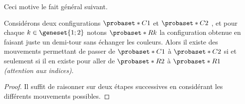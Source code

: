 Ceci motive le fait général suivant.


\begin{fact} \label{symmetry-no-color}
	Considérons deux configurations $\probaset*{C}{1}$ et $\probaset*{C}{2}$ , et pour chaque $k \in \geneset{1 ; 2}$ notons $\probaset*{R}{k}$ la configuration obtenue en faisant juste un demi-tour sans échanger les couleurs.
	Alors il existe des mouvements permettant de passer de $\probaset*{C}{1}$ à $\probaset*{C}{2}$ si et seulement si il en existe pour aller de $\probaset*{R}{2}$ à $\probaset*{R}{1}$ \emph{(attention aux indices)}.
\end{fact}


\begin{proof}
	Il suffit de raisonner sur deux étapes successives en considérant les différents mouvements possibles.
\end{proof}
